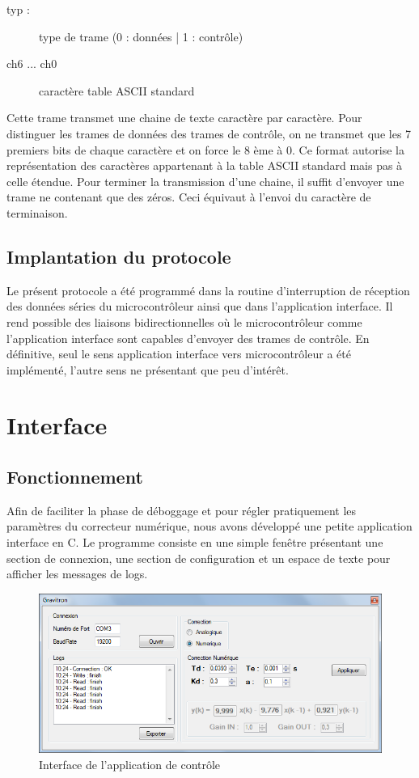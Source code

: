 \documentclass[11pt, french]{article} %
\begin{document}
\begin{itemize}
		\begin{description}
			\item[typ :] type de trame (0 : données | 1 : contrôle)
			\item[ch6 ... ch0] caractère table ASCII standard
		\end{description}

		Cette trame transmet une chaine de texte caractère par caractère. Pour distinguer les trames de données des trames de contrôle, on ne transmet que les 7 premiers bits de chaque caractère et on force le 8 ème à 0. Ce format autorise la représentation des caractères appartenant à la table ASCII standard mais pas à celle étendue. Pour terminer la transmission d'une chaine, il suffit d'envoyer une trame ne contenant que des zéros. Ceci équivaut à l'envoi du caractère de terminaison.

\end{itemize}

\subsection{Implantation du protocole}
Le présent protocole a été programmé dans la routine d'interruption de réception des données séries du microcontrôleur ainsi que dans l'application interface. Il rend possible des liaisons bidirectionnelles où le microcontrôleur comme l'application interface sont capables d'envoyer des trames de contrôle. En définitive, seul le sens application interface vers microcontrôleur a été implémenté, l'autre sens ne présentant que peu d'intérêt.

\section{Interface}
\subsection{Fonctionnement}
Afin de faciliter la phase de déboggage et pour régler pratiquement les paramètres du correcteur numérique, nous avons développé une petite application interface en C. Le programme consiste en une simple fenêtre présentant une section de connexion, une section de configuration et un espace de texte pour afficher les messages de logs.

\begin{figure}[h!]
	\centering
	\includegraphics[width = 12cm]{SolutionNumerique/IHM.png} 
	\caption{Interface de l'application de contrôle}
\end{figure}
\end{document}
